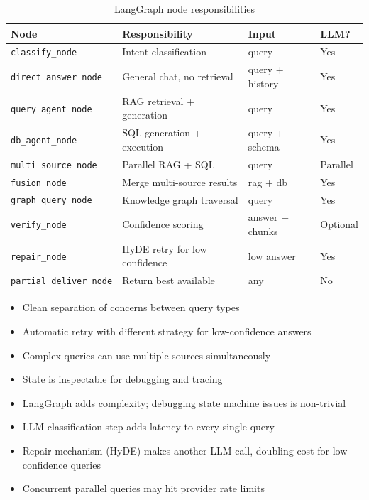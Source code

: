 \documentclass[12pt, a4paper, oneside]{report}
\newcommand{\kw}[1]{\texttt{\small #1}}
\begin{document}
\begin{table}[H]
\centering
\small
{}
\begin{tabularx}{\linewidth}{lXll}
\toprule
\rowcolor{rapidblue!10}
\textbf{Node} & \textbf{Responsibility} & \textbf{Input} & \textbf{LLM?} \\
\midrule
\kw{classify\_node} & Intent classification & query & Yes \\
\kw{direct\_answer\_node} & General chat, no retrieval & query + history & Yes \\
\kw{query\_agent\_node} & RAG retrieval + generation & query & Yes \\
\kw{db\_agent\_node} & SQL generation + execution & query + schema & Yes \\
\kw{multi\_source\_node} & Parallel RAG + SQL & query & Parallel \\
\kw{fusion\_node} & Merge multi-source results & rag + db & Yes \\
\kw{graph\_query\_node} & Knowledge graph traversal & query & Yes \\
\kw{verify\_node} & Confidence scoring & answer + chunks & Optional \\
\kw{repair\_node} & HyDE retry for low confidence & low answer & Yes \\
\kw{partial\_deliver\_node} & Return best available & any & No \\
\bottomrule
\end{tabularx}
\caption{LangGraph node responsibilities}
\end{table}

\begin{probox}[Benefits]
\begin{itemize}
  \item Clean separation of concerns between query types
  \item Automatic retry with different strategy for low-confidence answers
  \item Complex queries can use multiple sources simultaneously
  \item State is inspectable for debugging and tracing
\end{itemize}
\end{probox}

\begin{conbox}[Drawbacks]
\begin{itemize}
  \item LangGraph adds complexity; debugging state machine issues is non-trivial
  \item LLM classification step adds latency to every single query
  \item Repair mechanism (HyDE) makes another LLM call, doubling cost for low-confidence queries
  \item Concurrent parallel queries may hit provider rate limits
\end{itemize}
\end{conbox}
\end{document}
